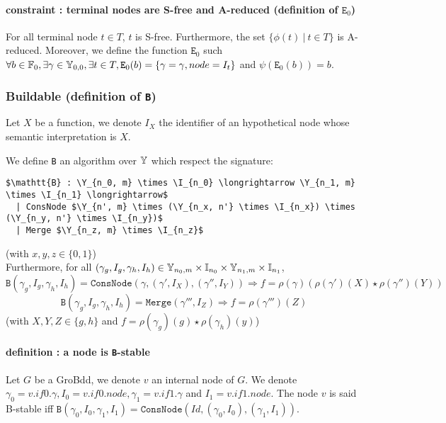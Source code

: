 \documentclass[a4paper,10pt]{article}
\begin{document}
\paragraph{constraint : terminal nodes are S-free and A-reduced (definition of $\mathtt{E}_0$)}
For all terminal node $t \in T$, $t$ is S-free.
Furthermore, the set $\{\phi(t) ~|~ t\in T\}$ is A-reduced.
Moreover, we define the function $\mathtt{E}_0$ such $\forall b\in\mathbb{F}_0, \exists \gamma\in\mathbb{Y}_{0, 0}, \exists t\in T, \mathtt{E}_0(b) = \{\gamma = \gamma, node = I_t\}$ and $\psi(\mathtt{E}_0(b)) = b$.


\subsubsection{Buildable (definition of \texttt{B})}

Let $X$ be a function, we denote $I_X$ the identifier of an hypothetical node whose semantic interpretation is $X$.

We define \texttt{B} an algorithm over $\mathbb{Y}$ which respect the signature:
\begin{lstlisting}
$\mathtt{B} : \Y_{n_0, m} \times \I_{n_0} \longrightarrow \Y_{n_1, m} \times \I_{n_1} \longrightarrow$
  | ConsNode $\Y_{n', m} \times (\Y_{n_x, n'} \times \I_{n_x}) \times (\Y_{n_y, n'} \times \I_{n_y})$
  | Merge $\Y_{n_z, m} \times \I_{n_z}$
\end{lstlisting}
(with $x, y, z \in \{0, 1\}$) \\
Furthermore, for all $(\gamma_g, I_g, \gamma_h, I_h) \in \mathbb{Y}_{n_0, m} \times \mathbb{I}_{n_0} \times \mathbb{Y}_{n_1, m} \times \mathbb{I}_{n_1}$, 
\[ \texttt{B}(\gamma_g, I_g, \gamma_h, I_h) = \texttt{ConsNode} (\gamma, (\gamma', I_X), (\gamma'', I_Y)) \Rightarrow f = \rho\left(\gamma\right) \left(\rho\left(\gamma'\right)(X) \star \rho\left(\gamma''\right)(Y)\right)\]
\[ \texttt{B}(\gamma_g, I_g, \gamma_h, I_h) = \texttt{Merge} (\gamma''', I_Z) \Rightarrow f = \rho(\gamma''')(Z) \]
(with $X, Y, Z \in\{g, h\}$ and $f = \rho(\gamma_g)(g) \star \rho(\gamma_h)(y)$)

\paragraph{definition : a node is \texttt{B}-stable\\}
Let $G$ be a GroBdd, we denote $v$ an internal node of $G$.
We denote $\gamma_0 = v.if0.\gamma, I_0 = v.if0.node, \gamma_1 = v.if1.\gamma$ and $I_1 = v.if1.node$.
The node $v$ is said B-stable iff $\mathtt{B}(\gamma_0, I_0, \gamma_1, I_1) = \mathtt{ConsNode}(Id, (\gamma_0, I_0), (\gamma_1, I_1))$.
\end{document}
